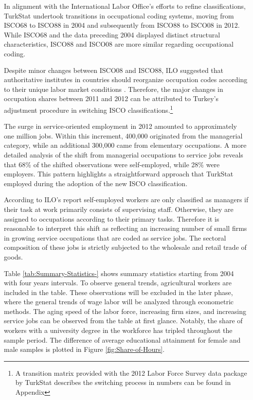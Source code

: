 \begin{onehalfspace}
In alignment with the International Labor Office's efforts to refine
classifications, TurkStat undertook transitions in occupational coding
systems, moving from ISCO68 to ISCO88 in 2004 and subsequently from
ISCO88 to ISCO08 in 2012. While ISCO68 and the data preceding 2004
displayed distinct structural characteristics, ISCO88 and ISCO08 are
more similar regarding occupational coding.

Despite minor changes between ISCO08 and ISCO88, ILO suggested that
authoritative institutes in countries should reorganize occupation
codes according to their unique labor market conditions \citep{ILO2012}.
Therefore, the major changes in occupation shares between 2011 and
2012 can be attributed to Turkey's adjustment procedure in switching
ISCO classifications.\footnote{A transition matrix provided with the 2012 Labor Force Survey data
package by TurkStat describes the switching process in numbers can
be found in Appendix}

The surge in service-oriented employment in 2012 amounted to approximately
one million jobs. Within this increment, 400,000 originated from the
managerial category, while an additional 300,000 came from elementary
occupations. A more detailed analysis of the shift from managerial
occupations to service jobs reveals that 68\% of the shifted observations
were self-employed, while 28\% were employers. This pattern highlights
a straightforward approach that TurkStat employed during the adoption
of the new ISCO classification.

According to ILO's report \citep{ILO2012} self-employed workers are
only classified as managers if their task at work primarily consists
of supervising staff. Otherwise, they are assigned to occupations
according to their primary tasks. Therefore it is reasonable to interpret
this shift as reflecting an increasing number of small firms in growing
service occupations that are coded as service jobs. The sectoral composition
of these jobs is strictly subjected to the wholesale and retail trade
of goods.

Table \ref{tab:Summary-Statistics-} shows summary statistics starting
from 2004 with four years intervals. To observe general trends, agricultural
workers are included in the table. These observations will be excluded
in the later phase, where the general trends of wage labor will be
analyzed through econometric methods. The aging speed of the labor
force, increasing firm sizes, and increasing service jobs can be observed
from the table at first glance. Notably, the share of workers with
a university degree in the workforce has tripled throughout the sample
period. The difference of average educational attainment for female
and male samples is plotted in Figure \ref{fig:Share-of-Hours}.


\end{onehalfspace}
